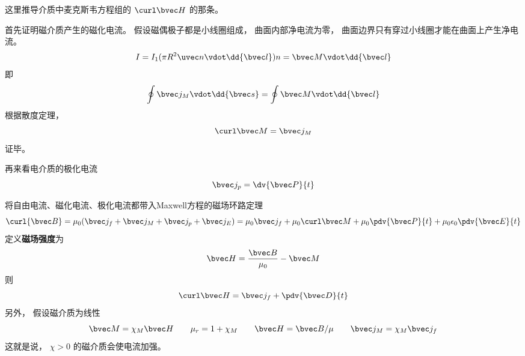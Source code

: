 


这里推导介质中麦克斯韦方程组的 $\curl \bvec H$ 的那条。

首先证明磁介质产生的磁化电流。 假设磁偶极子都是小线圈组成， 曲面内部净电流为零， 曲面边界只有穿过小线圈才能在曲面上产生净电流。
\begin{equation}
I = I_1 (\pi R^2 \uvec n \vdot \dd{\bvec l}) n = \bvec M \vdot \dd{\bvec l}
\end{equation}
即
\begin{equation}
\oint \bvec j_M \vdot \dd{\bvec s} = \oint \bvec M \vdot \dd{\bvec l}
\end{equation}
根据散度定理，
\begin{equation}
\curl \bvec M = \bvec j_M
\end{equation}
证毕。

再来看电介质的极化电流
\begin{equation}
\bvec j_p = \dv{\bvec P}{t}
\end{equation}

将自由电流、磁化电流、极化电流都带入Maxwell方程的磁场环路定理
\begin{equation}
\curl {\bvec B} = \mu_0 (\bvec j_f + \bvec j_M + \bvec j_p + \bvec j_E) = \mu_0 \bvec j_f + \mu_0 \curl \bvec M + \mu_0 \pdv{\bvec P}{t} + \mu_0 \epsilon_0 \pdv{\bvec E}{t}
\end{equation}
定义\textbf{磁场强度}为
\begin{equation}
\bvec H = \frac{\bvec B}{\mu_0} - \bvec M
\end{equation}
则
\begin{equation}
\curl \bvec H = \bvec j_f + \pdv{\bvec D}{t}
\end{equation}
另外， 假设磁介质为线性
\begin{equation}
\bvec M = \chi_M \bvec H
\qquad
\mu_r = 1 + \chi_M
\qquad
\bvec H = \bvec B/\mu
\qquad
\bvec j_M = \chi_M \bvec j_f
\end{equation}
这就是说， $\chi > 0$ 的磁介质会使电流加强。
